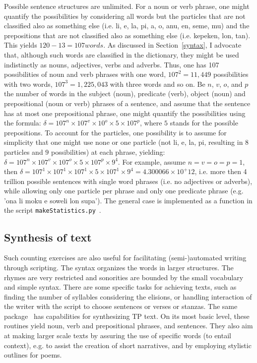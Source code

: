\documentclass{article}
\newcommand{\tttt}[1]{\texttt{#1}}
\begin{document}
Possible sentence structures are unlimited.
For a noun or verb phrase, one might quantify the possibilities
by considering all words but the particles that are not classified
also as something else
(i.e. li, e, la, pi, a, o, anu, en, seme, mu)
and the prepositions that are not classified also as something
else (i.e. kepeken, lon, tan).
This yields $120-13=107 words$.
As discussed in Section~\ref{syntax},
I advocate that, although such words are classified in the dictionary,
they might be used indistinctly as nouns, adjectives,
verbs and adverbs.
Thus, one has 107 possibilities of noun and verb phrases with
one word, $107^2=11,449$ possibilities with two words,
$107^3=1,225,043$ with three words and so on.
Be $n$, $v$, $o$, and $p$ the number of words in the subject (noun), predicate
(verb), object (noun) and prepositional (noun or verb) phrases of a sentence,
and assume that the sentence has at most one prepositional phrase,
one might quantify the possibilities using the formula:
$\delta = 107^n\times 107^v\times 10^o \times 5\times 107^p$,
where $5$ stands for the possible prepositions.
To account for the particles, one possibility is
to assume for simplicity that one might use none or one particle
(not li, e, la, pi, resulting in $8$ particles and $9$ possibilities)
at each phrase, yielding:
$\delta = 107^n\times 107^v\times 107^o \times 5\times 107^p\times 9^4$.
For example, assume $n=v=o=p=1$, then
$\delta=107^1\times 107^1\times 107^1 \times 5\times 107^1\times 9^4=
 4.300066\times 10^+12$,
i.e. more then 4 trillion possible
sentences with single word phrases (i.e. no adjectives or adverbs),
while allowing only one particle per phrase
and only one predicate phrase
(e.g. 'ona li moku e soweli lon supa').
The general case is implemented as a function
in the script \tttt{makeStatistics.py}~\cite{tokipona}.

\subsection{Synthesis of text}\label{synth}
Such counting exercises are also useful
for facilitating (semi-)automated writing through scripting.
The syntax organizes the words in larger structures.
The rhymes are very restricted and sonorities are
bounded by the small vocabulary and simple syntax.
There are some specific tasks for achieving texts,
such as finding the number of syllables considering the elisions,
or handling interaction of the writer with the script
to choose sentences or verses or stanzas.
The same package~\cite{tokipona}
has capabilities for synthesizing TP text.
On its most basic level, these routines yield
noun, verb and prepositional phrases,
and sentences.
They also aim at making larger scale texts
by assuring the use of specific words (to entail context),
e.g. to assist the creation of short narratives,
and by employing stylistic outlines for poems.
\end{document}
